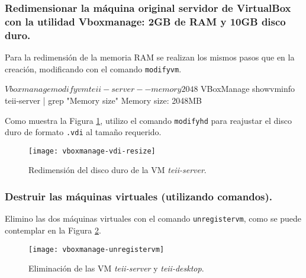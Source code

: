 \subsubsection{Redimensionar la máquina original servidor de VirtualBox con la utilidad Vboxmanage: 2GB de RAM y 10GB disco duro.} 
\par Para la redimensión de la memoria RAM se realizan los mismos pasos que en la creación, modificando 
con el comando \texttt{modifyvm}.
\begin{listing}[style=consola]
    $ Vboxmanage modifyvm teii-server --memory 2048
    $ VBoxManage showvminfo teii-server | grep "Memory size"
    Memory size:                 2048MB
\end{listing}
\par Como muestra la Figura \ref{fig:vboxmanage-vdi-resize}, utilizo el comando \texttt{modifyhd}
para reajustar el disco duro de formato \texttt{.vdi} al tamaño requerido.
\begin{figure}[H]
    \texttt{[image: vboxmanage-vdi-resize]}
    \centering
    \caption{Redimensión del disco duro de la VM \textit{teii-server}.}
    \label{fig:vboxmanage-vdi-resize}
\end{figure}

\subsubsection{Destruir las máquinas virtuales (utilizando comandos).}
\par Elimino las dos máquinas virtuales con el comando \texttt{unregistervm}, como se puede 
contemplar en la Figura \ref{fig:vboxmanage-unregistervm}.
\begin{figure}[H]
    \texttt{[image: vboxmanage-unregistervm]}
    \centering
    \caption{Eliminación de las VM \textit{teii-server} y \textit{teii-desktop}.}
    \label{fig:vboxmanage-unregistervm}
\end{figure}


